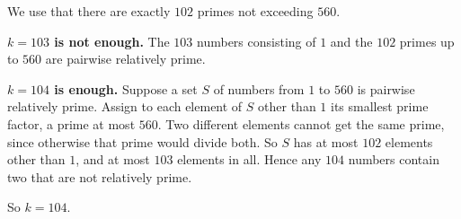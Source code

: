 We use that there are exactly $102$ primes not exceeding $560$.

\textbf{$k=103$ is not enough.} The $103$ numbers consisting of $1$ and the $102$ primes up to $560$ are pairwise relatively prime.

\textbf{$k=104$ is enough.} Suppose a set $S$ of numbers from $1$ to $560$ is pairwise relatively prime. Assign to each element of $S$ other than $1$ its smallest prime factor, a prime at most $560$. Two different elements cannot get the same prime, since otherwise that prime would divide both. So $S$ has at most $102$ elements other than $1$, and at most $103$ elements in all. Hence any $104$ numbers contain two that are not relatively prime.

So $k=\boxed{104}$.
